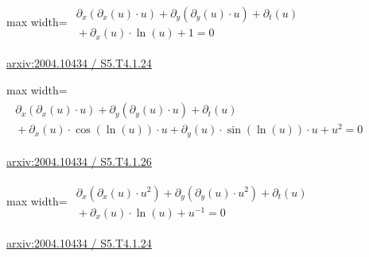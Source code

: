 \documentclass[UTF8,10pt,a4paper,fontset=mac]{ctexart}
\begin{document}
\begin{minipage}{\linewidth}\begin{center}\begin{adjustbox}{max width=\linewidth}$\displaystyle\begin{gathered}\begin{gathered}\partial_{x}(\partial_{x}(u)\cdot u)+\partial_{y}(\partial_{y}(u)\cdot u)+\partial_{t}(u)\\[-1pt]{}+\partial_{x}(u)\cdot \ln(u)+1=0\end{gathered}\end{gathered}$\end{adjustbox}\end{center}{\small\href{https://arxiv.org/html/2004.10434#S5.T4.1.24}{arxiv:2004.10434 / S5.T4.1.24}}\par\end{minipage}\par\vspace{6mm}

\begin{minipage}{\linewidth}\begin{center}\begin{adjustbox}{max width=\linewidth}$\displaystyle\begin{gathered}\begin{gathered}\partial_{x}(\partial_{x}(u)\cdot u)+\partial_{y}(\partial_{y}(u)\cdot u)+\partial_{t}(u)\\[-1pt]{}+\partial_{x}(u)\cdot \cos(\ln(u))\cdot u+\partial_{y}(u)\cdot \sin(\ln(u))\cdot u+u^{2}=0\end{gathered}\end{gathered}$\end{adjustbox}\end{center}{\small\href{https://arxiv.org/html/2004.10434#S5.T4.1.26}{arxiv:2004.10434 / S5.T4.1.26}}\par\end{minipage}\par\vspace{6mm}

\begin{minipage}{\linewidth}\begin{center}\begin{adjustbox}{max width=\linewidth}$\displaystyle\begin{gathered}\begin{gathered}\partial_{x}(\partial_{x}(u)\cdot u^{2})+\partial_{y}(\partial_{y}(u)\cdot u^{2})+\partial_{t}(u)\\[-1pt]{}+\partial_{x}(u)\cdot \ln(u)+u^{-1}=0\end{gathered}\end{gathered}$\end{adjustbox}\end{center}{\small\href{https://arxiv.org/html/2004.10434#S5.T4.1.24}{arxiv:2004.10434 / S5.T4.1.24}}\par\end{minipage}\par\vspace{6mm}
\end{document}

